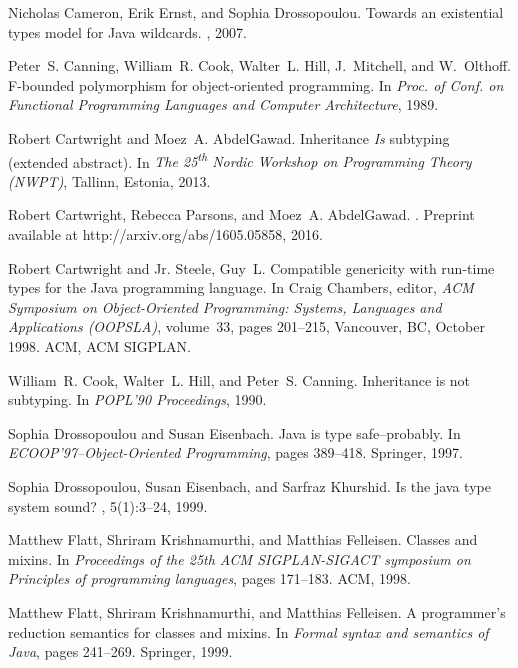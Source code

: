 \documentclass[twocolumn,english]{article}
\numberwithin{equation}{section}
\numberwithin{figure}{section}
\begin{document}
\begin{thebibliography}{10}
	Nicholas Cameron, Erik Ernst, and Sophia Drossopoulou.
	\newblock Towards an existential types model for {J}ava wildcards.
	, 2007.
	
	Peter~S. Canning, William~R. Cook, Walter~L. Hill, J.~Mitchell, and W.~Olthoff.
	\newblock F-bounded polymorphism for object-oriented programming.
	\newblock In {\em Proc. of Conf. on Functional Programming Languages and
		Computer Architecture}, 1989.
	
	Robert Cartwright and Moez~A. AbdelGawad.
	\newblock Inheritance \emph{Is} subtyping (extended abstract).
	\newblock In {\em The 25\textsuperscript{th} Nordic Workshop on Programming
		Theory (NWPT)}, Tallinn, Estonia, 2013.
	
	Robert Cartwright, Rebecca Parsons, and Moez~A. AbdelGawad.
	.
	\newblock Preprint available at http://arxiv.org/abs/1605.05858, 2016.
	
	Robert Cartwright and Jr. Steele, Guy~L.
	\newblock Compatible genericity with run-time types for the {J}ava programming
	language.
	\newblock In Craig Chambers, editor, {\em ACM Symposium on Object-Oriented
		Programming: Systems, Languages and Applications (OOPSLA)}, volume~33, pages
	201--215, Vancouver, BC, October 1998. ACM, ACM SIGPLAN.
	
	William~R. Cook, Walter~L. Hill, and Peter~S. Canning.
	\newblock Inheritance is not subtyping.
	\newblock In {\em POPL'90 Proceedings}, 1990.
	
	Sophia Drossopoulou and Susan Eisenbach.
	\newblock Java is type safe--probably.
	\newblock In {\em ECOOP'97--Object-Oriented Programming}, pages 389--418.
	Springer, 1997.
	
	Sophia Drossopoulou, Susan Eisenbach, and Sarfraz Khurshid.
	\newblock Is the java type system sound?
	, 5(1):3--24, 1999.
	
	Matthew Flatt, Shriram Krishnamurthi, and Matthias Felleisen.
	\newblock Classes and mixins.
	\newblock In {\em Proceedings of the 25th ACM SIGPLAN-SIGACT symposium on
		Principles of programming languages}, pages 171--183. ACM, 1998.
	
	Matthew Flatt, Shriram Krishnamurthi, and Matthias Felleisen.
	\newblock A programmer's reduction semantics for classes and mixins.
	\newblock In {\em Formal syntax and semantics of Java}, pages 241--269.
	Springer, 1999.
	

\end{thebibliography}
\end{document}

